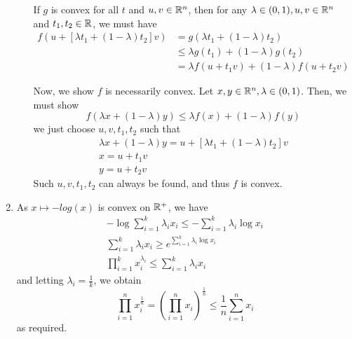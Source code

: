 \begin{enumerate}[label*=Ex \arabic*.]
\begin{enumerate}
      If $g$ is convex for all $t$ and $u, v \in \mathbb{R}^{n}$, then for any
      $\lambda \in (0, 1), u, v \in \mathbb{R}^{n}$ and $t_{1}, t_{2} \in \mathbb{R}$,
      we must have
      \begin{align}
        \label{eq:18}
        f(u + [\lambda t_{1} + (1-\lambda) t_{2}] v) &= g(\lambda
        t_{1} + (1-\lambda) t_{2}) \\
        &\leq \lambda g(t_{1}) + (1-\lambda) g(t_{2}) \\
        &= \lambda f(u + t_{1} v) + (1-\lambda) f(u + t_{2} v)
      \end{align}

      Now, we show $f$ is necessarily convex.  Let $x, y \in \mathbb{R}^{n},
      \lambda \in (0, 1)$. Then, we must show
      \begin{equation}
        \label{eq:20}
        f(\lambda x + (1-\lambda) y) \leq \lambda f(x) + (1-\lambda) f(y)
      \end{equation}
      we just choose $u, v, t_{1}, t_{2}$ such that
      \begin{align}
        \label{eq:19}
        \lambda x + (1-\lambda) y = u + [\lambda t_{1} + (1-\lambda)
        t_{2}] v \\
        x = u + t_{1} v \\
        y = u + t_{2} v
      \end{align}
      Such $u, v, t_{1}, t_{2}$ can always be found, and thus $f$ is convex.
  \end{enumerate}
\item \label{item:6}
  As $x \mapsto -log(x)$ is convex on $\mathbb{R}^{+}$, we have
  \begin{align}
    \label{eq:21}
    - \log \sum_{i=1}^{k} \lambda_{i} x_{i} \leq - \sum_{i=1}^{k}
    \lambda_{i} \log x_{i} \\
    \sum_{i=1}^{k} \lambda_{i} x_{i} \geq e^{\sum_{i=1}^{k} \lambda_{i} \log x_{i}} \\
    \prod_{i=1}^{k} x_{i}^{\lambda_{i}} \leq \sum_{i=1}^{k}
    \lambda_{i} x_{i}
  \end{align} and letting $\lambda_{i} = \frac{1}{k}$, we obtain
  \begin{equation}
    \label{eq:22}
    \prod_{i=1}^{n} x_{i}^{\frac{1}{n}} = \left(\prod_{i=1}^{n} x_{i}
    \right)^{\frac{1}{n}} \leq \frac{1}{n} \sum_{i=1}^{n} x_{i}
  \end{equation} as required.


\end{enumerate}
